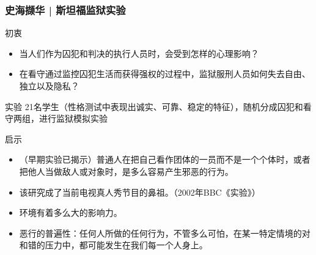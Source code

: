 \begin{frame}
  \frametitle{史海撷华 | 斯坦福监狱实验}
  \vspace{-0.7em}
  \begin{block}{初衷}
    \begin{itemize}
      \item 当人们作为囚犯和判决的执行人员时，会受到怎样的心理影响？
      \item 在看守通过监控囚犯生活而获得强权的过程中，监狱服刑人员如何失去自由、独立以及隐私？
    \end{itemize}
  \end{block}
  \vspace{-0.7em}
  \pause
  \begin{block}{实验}
    21名学生（性格测试中表现出诚实、可靠、稳定的特征），随机分成囚犯和看守两组，进行监狱模拟实验
  \end{block}
  \vspace{-0.7em}
  \pause
  \begin{block}{启示}
    \begin{itemize}
      \item （早期实验已揭示）普通人在把自己看作团体的一员而不是一个个体时，或者把他人当做敌人或对象时，是多么容易产生邪恶的行为。
      \item 该研究成了当前电视真人秀节目的鼻祖。（2002年BBC《实验》）
      \item 环境有着多么大的影响力。
      \item 恶行的普遍性：任何人所做的任何行为，不管多么可怕，在某一特定情境的对和错的压力中，都可能发生在我们每一个人身上。
    \end{itemize}
  \end{block}
\end{frame}

